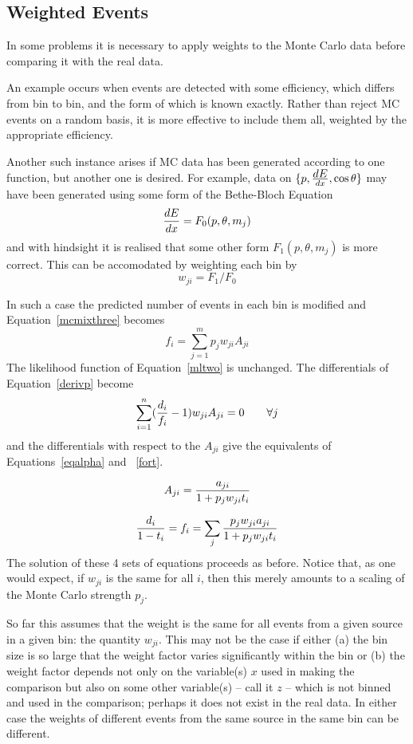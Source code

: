 \begin{changebar}
\subsection*{Weighted Events}
 
In some problems it is necessary to apply weights to the Monte Carlo data
before comparing it with the real data.
 
An example occurs when events are detected with some efficiency,
which differs from bin to bin, and
the form of which is known exactly.  Rather than reject MC events on a random
basis, it is more effective to include them all, weighted by the appropriate
efficiency.
 
Another such instance arises if MC  data has been generated
according to one function, but another one is desired.   For example, data
on $\{p, {\textstyle dE \over dx}, \cos\theta\}$ may have been generated using some
form of the Bethe-Bloch Equation
$${dE \over dx} = F_0(p,\theta,m_j)$$
and with hindsight it is realised that some other form $F_1(p,\theta,m_j)$
is more correct.   This can be accomodated by weighting each bin by
$$w_{ji}=F_1 / F_0$$
 
In such a case the predicted number of events in each bin is modified
and Equation~\ref{mcmixthree} becomes
\begin{equation}
f_i = \sum_{j=1}^m p_j w_{ji} A_{ji}\label{wmcmix}
\end{equation}
The likelihood function of Equation~\ref{mltwo} is unchanged. The
differentials of Equation~\ref{derivp} become
\begin{equation}
\sum_{i=1}^n ({d_i \over f_i} -1) w_{ji} A_{ji}=0\qquad \forall j
\label{wderivp}
\end{equation}
and the differentials with respect to the $A_{ji}$ give the
equivalents of Equations~\ref{eqalpha} and ~\ref{fort}.
 
\begin{equation}
A_{ji} = {a_{ji} \over 1 + p_j w_{ji} t_i} \label{eqwalpha}
\end{equation}
 
\begin{equation}
{d_i \over 1 - t_i} = f_i =  \sum_j {p_j w_{ji} a_{ji}
\over 1 + p_j w_{ji} t_i} \label{wfort}
\end{equation}
The solution of these 4 sets of equations proceeds as before.
Notice that, as one would expect, if $w_{ji}$ is the same for all $i$, then
this merely amounts to a scaling of the Monte Carlo strength $p_j$.
 
So far this assumes that the weight is the same for all events
from a given source in a given bin: the quantity $w_{ji}$.
This may not be the case if either (a) the bin size is so large that the
weight factor varies significantly within the bin or (b) the
weight factor depends not only on the variable(s) $x$ used in making the
comparison but also on some other variable(s) -- call it $z$ -- which is
not binned and used in the comparison;
perhaps it does not exist in the real data.  In either
case the weights of different events from the same source
in the same bin can be different.
 

\end{changebar}

